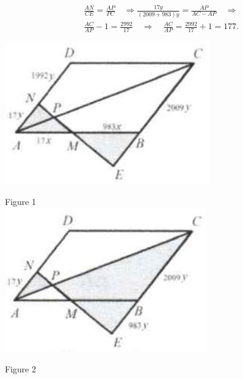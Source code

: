 \documentclass[10pt]{article}
\begin{document}
\[
\begin{aligned}
& \frac{A N}{C E}=\frac{A P}{P C} \quad \Rightarrow \frac{17 y}{(2009+983) y}=\frac{A P}{A C-A P} \quad \Rightarrow \\
& \frac{A C}{A P}-1=\frac{2992}{17} \quad \Rightarrow \quad \frac{A C}{A P}=\frac{2992}{17}+1=177 .
\end{aligned}
\]

\begin{center}
\includegraphics[max width=\textwidth]{2025_04_17_97bc1f7e44d93c271a88g-142(1)}
\end{center}

Figure 1\\
\includegraphics[max width=\textwidth, center]{2025_04_17_97bc1f7e44d93c271a88g-142(4)}

Figure 2
\end{document}
